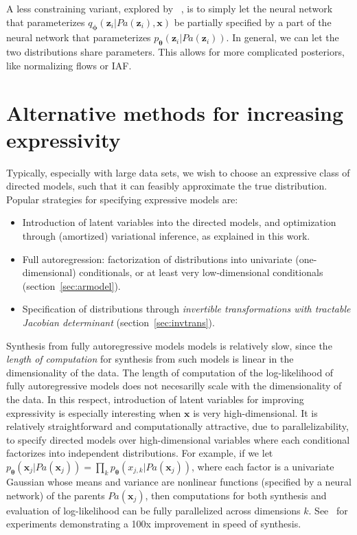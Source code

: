 \documentclass[MAL,biber]{nowfnt} %
\newcommand{\bb}[1]{\mathbf{#1}}
\newcommand{\bx}{\bb{x}}
\newcommand{\bz}{\bb{z}}
\newcommand{\bT}{\boldsymbol{\theta}}
\newcommand{\bphi}{\boldsymbol{\phi}}
\newcommand{\pT}{p_{\bT}}
\newcommand{\qP}{q_{\bphi}}
\begin{document}
A less constraining variant, explored by ~\citep{kingma2016improving}, is to simply let the neural network that parameterizes $\qP(\bz_i|Pa(\bz_i),\bx)$ be partially specified by a part of the neural network that parameterizes $\pT(\bz_i|Pa(\bz_i))$. In general, we can let the two distributions share parameters. This allows for more complicated posteriors, like normalizing flows or IAF.

\section{Alternative methods for increasing expressivity}

Typically, especially with large data sets, we wish to choose an expressive class of directed models, such that it can feasibly approximate the true distribution. Popular strategies for specifying expressive models are:
\begin{itemize}
	\item Introduction of latent variables into the directed models, and optimization through (amortized) variational inference, as explained in this work.
	\item Full autoregression: factorization of distributions into univariate (one-dimensional) conditionals, or at least very low-dimensional conditionals (section~\ref{sec:armodel}). 
	\item Specification of distributions through \emph{invertible transformations with \allowbreak tractable Jacobian determinant} (section~\ref{sec:invtrans}).
\end{itemize}

Synthesis from fully autoregressive models models is relatively slow, since the \emph{length of computation} for synthesis from such models is linear in the dimensionality of the data. The length of computation of the log-likelihood of fully autoregressive models does not necesarilly scale with the dimensionality of the data. In this respect, introduction of latent variables for improving expressivity is especially interesting when $\bx$ is very high-dimensional. It is relatively straightforward and computationally attractive, due to parallelizability, to specify directed models over high-dimensional variables where each conditional factorizes into independent distributions. For example, if we let $\pT(\bx_j | Pa(\bx_j)) = \prod_k \pT(x_{j,k} | Pa(\bx_j))$, where each factor is a univariate Gaussian whose means and variance are nonlinear functions (specified by a neural network) of the parents $Pa(\bx_j)$, then computations for both synthesis and evaluation of log-likelihood can be fully parallelized across dimensions $k$. See~\citep{kingma2016improving} for experiments demonstrating a 100x improvement in speed of synthesis.
\end{document}
